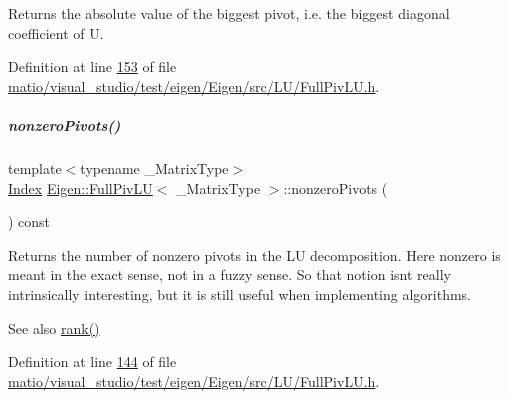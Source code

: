 \begin{DoxyReturn}{Returns}
the absolute value of the biggest pivot, i.\+e. the biggest diagonal coefficient of U. 
\end{DoxyReturn}


Definition at line \hyperlink{matio_2visual__studio_2test_2eigen_2_eigen_2src_2_l_u_2_full_piv_l_u_8h_source_l00153}{153} of file \hyperlink{matio_2visual__studio_2test_2eigen_2_eigen_2src_2_l_u_2_full_piv_l_u_8h_source}{matio/visual\+\_\+studio/test/eigen/\+Eigen/src/\+L\+U/\+Full\+Piv\+L\+U.\+h}.

\mbox{\label{group___l_u___module_aa71132a751ad3c78178e33d6b2987400}} 
\subparagraph{\texorpdfstring{nonzero\+Pivots()}{nonzeroPivots()}\hspace{0.1cm}{\footnotesize\ttfamily [1/2]}}
{\footnotesize\ttfamily template$<$typename \+\_\+\+Matrix\+Type$>$ \\
\hyperlink{group___core___module_a554f30542cc2316add4b1ea0a492ff02}{Index} \hyperlink{group___l_u___module_class_eigen_1_1_full_piv_l_u}{Eigen\+::\+Full\+Piv\+LU}$<$ \+\_\+\+Matrix\+Type $>$\+::nonzero\+Pivots (\begin{DoxyParamCaption}{ }\end{DoxyParamCaption}) const\hspace{0.3cm}{\ttfamily [inline]}}

\begin{DoxyReturn}{Returns}
the number of nonzero pivots in the LU decomposition. Here nonzero is meant in the exact sense, not in a fuzzy sense. So that notion isn\textquotesingle{}t really intrinsically interesting, but it is still useful when implementing algorithms.
\end{DoxyReturn}
\begin{DoxySeeAlso}{See also}
\hyperlink{group___l_u___module_a67a870aa69e699e058d04802ba0bdad9}{rank()} 
\end{DoxySeeAlso}


Definition at line \hyperlink{matio_2visual__studio_2test_2eigen_2_eigen_2src_2_l_u_2_full_piv_l_u_8h_source_l00144}{144} of file \hyperlink{matio_2visual__studio_2test_2eigen_2_eigen_2src_2_l_u_2_full_piv_l_u_8h_source}{matio/visual\+\_\+studio/test/eigen/\+Eigen/src/\+L\+U/\+Full\+Piv\+L\+U.\+h}.

